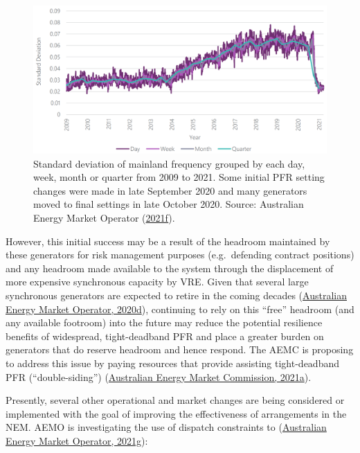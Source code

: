 \documentclass[12pt,a4paper,]{report}
\begin{document}
\begin{figure}
\hypertarget{fig:mpfr_dist}{%
\centering
\includegraphics{source/figures/f_stddev_2009_2021.png}
\caption[Standard deviation of NEM mainland frequency from 2009 to
2021]{Standard deviation of mainland frequency grouped by each day,
week, month or quarter from 2009 to 2021. Some initial PFR setting
changes were made in late September 2020 and many generators moved to
final settings in late October 2020. Source: Australian Energy Market
Operator
(\protect\hyperlink{ref-australianenergymarketoperatorEnduringPrimaryFrequency2021}{2021f}).}\label{fig:mpfr_dist}
}
\end{figure}

However, this initial success may be a result of the headroom maintained
by these generators for risk management purposes (e.g.~defending
contract positions) and any headroom made available to the system
through the displacement of more expensive synchronous capacity by VRE.
Given that several large synchronous generators are expected to retire
in the coming decades
(\protect\hyperlink{ref-australianenergymarketoperator2020IntegratedSystem2020}{Australian
Energy Market Operator, 2020d}), continuing to rely on this ``free''
headroom (and any available footroom) into the future may reduce the
potential resilience benefits of widespread, tight-deadband PFR and
place a greater burden on generators that do reserve headroom and hence
respond. The AEMC is proposing to address this issue by paying resources
that provide assisting tight-deadband PFR (``double-siding'')
(\protect\hyperlink{ref-australianenergymarketcommissionPrimaryFrequencyResponse2021}{Australian
Energy Market Commission, 2021a}).

Presently, several other operational and market changes are being
considered or implemented with the goal of improving the effectiveness
of arrangements in the NEM. AEMO is investigating the use of dispatch
constraints to
(\protect\hyperlink{ref-australianenergymarketoperatorFrequencyControlWork2021}{Australian
Energy Market Operator, 2021g}):
\end{document}

